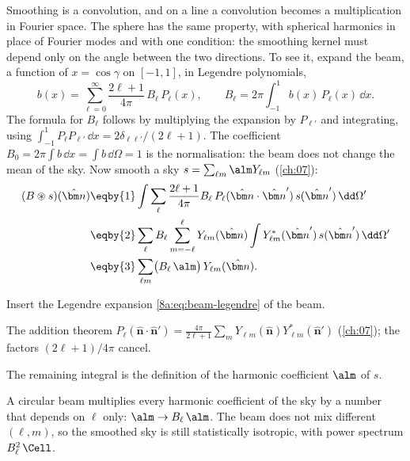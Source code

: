 Smoothing is a convolution, and on a line a convolution becomes a multiplication in Fourier
space. The sphere has the same property, with spherical harmonics in place of Fourier
modes and with one condition: the smoothing kernel must depend only on the angle between the
two directions. To see it, expand the beam, a function of $x=\cos\gamma$ on $[-1,1]$, in
Legendre polynomials,
\begin{equation}
  b(x)=\sum_{\ell=0}^{\infty}\frac{2\ell+1}{4\pi}\,B_\ell\,P_\ell(x),
  \qquad
  B_\ell=2\pi\int_{-1}^{1}b(x)\,P_\ell(x)\,\dd x .
  \label{8a:eq:beam-legendre}
\end{equation}
The formula for $B_\ell$ follows by multiplying the expansion by $P_{\ell'}$ and integrating,
using $\int_{-1}^1P_\ell P_{\ell'}\,\dd x=2\delta_{\ell\ell'}/(2\ell+1)$. The coefficient
$B_0=2\pi\int b\,\dd x=\int b\,\dd\Omega=1$ is the normalisation: the beam does not change the
mean of the sky. Now smooth a sky $s=\sum_{\ell m}\alm Y_{\ell m}$ (\cref{ch:07}):
\begin{align}
  (B\circledast s)(\hat{\bm n})
  &\eqby{1}\int\sum_{\ell}\frac{2\ell+1}{4\pi}B_\ell\,P_\ell(\hat{\bm n}\cdot\hat{\bm n}')\,s(\hat{\bm n}')\,\dd\Omega' \nonumber\\
  &\eqby{2}\sum_{\ell}B_\ell\sum_{m=-\ell}^{\ell}Y_{\ell m}(\hat{\bm n})\int Y^*_{\ell m}(\hat{\bm n}')\,s(\hat{\bm n}')\,\dd\Omega' \nonumber\\
  &\eqby{3}\sum_{\ell m}\bigl(B_\ell\,\alm\bigr)\,Y_{\ell m}(\hat{\bm n}) .
  \label{8a:eq:convolution}
\end{align}
\begin{explain}
  \item Insert the Legendre expansion \eqref{8a:eq:beam-legendre} of the beam.
  \item The addition theorem $P_\ell(\hat{\bm n}\cdot\hat{\bm n}')=\frac{4\pi}{2\ell+1}\sum_m
        Y_{\ell m}(\hat{\bm n})Y^*_{\ell m}(\hat{\bm n}')$ (\cref{ch:07}); the factors $(2\ell+1)/4\pi$ cancel.
  \item The remaining integral is the definition of the harmonic coefficient $\alm$ of $s$.
\end{explain}

\begin{keyidea}
A circular beam multiplies every harmonic coefficient of the sky by a number that depends
on $\ell$ only: $\alm\to B_\ell\,\alm$. The beam does not mix different $(\ell,m)$, so the
smoothed sky is still statistically isotropic, with power spectrum $B_\ell^2\,\Cell$.
\end{keyidea}

